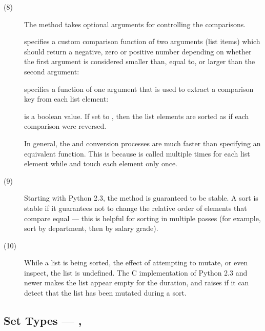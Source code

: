 \begin{description}
\item[(8)] The  method takes optional arguments for
  controlling the comparisons.

   specifies a custom comparison function of two arguments
     (list items) which should return a negative, zero or positive number
     depending on whether the first argument is considered smaller than,
     equal to, or larger than the second argument:
     
   specifies a function of one argument that is used to
     extract a comparison key from each list element:

   is a boolean value.  If set to , then the
     list elements are sorted as if each comparison were reversed.

  In general, the  and  conversion processes are
  much faster than specifying an equivalent  function.  This is
  because  is called multiple times for each list element while
   and  touch each element only once.



\item[(9)] Starting with Python 2.3, the  method is
  guaranteed to be stable.  A sort is stable if it guarantees not to
  change the relative order of elements that compare equal --- this is
  helpful for sorting in multiple passes (for example, sort by
  department, then by salary grade).

\item[(10)] While a list is being sorted, the effect of attempting to
  mutate, or even inspect, the list is undefined.  The C
  implementation of Python 2.3 and newer makes the list appear empty
  for the duration, and raises  if it can detect
  that the list has been mutated during a sort.
\end{description}

\subsection{Set Types ---
	    , 
	    \label{types-set}}

